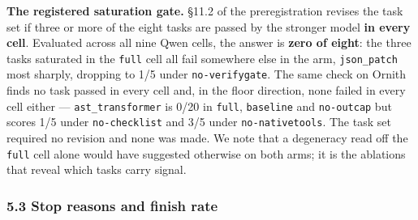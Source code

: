 \documentclass[
  10pt,
  a4paper,
]{article}
\newcounter{none} %
\let\oldtexttt\texttt
\renewcommand{\texttt}[1]{{\small\oldtexttt{#1}}}
\begin{document}
\textbf{The registered saturation gate.} §11.2 of the preregistration
revises the task set if three or more of the eight tasks are passed by
the stronger model \textbf{in every cell}. Evaluated across all nine
Qwen cells, the answer is \textbf{zero of eight}: the three tasks
saturated in the \texttt{full} cell all fail somewhere else in the arm,
\texttt{json\_patch} most sharply, dropping to 1/5 under
\texttt{no-verifygate}. The same check on Ornith finds no task passed in
every cell and, in the floor direction, none failed in every cell either
--- \texttt{ast\_transformer} is 0/20 in \texttt{full},
\texttt{baseline} and \texttt{no-outcap} but scores 1/5 under
\texttt{no-checklist} and 3/5 under \texttt{no-nativetools}. The task
set required no revision and none was made. We note that a degeneracy
read off the \texttt{full} cell alone would have suggested otherwise on
both arms; it is the ablations that reveal which tasks carry signal.

\subsubsection{5.3 Stop reasons and finish
rate}\label{stop-reasons-and-finish-rate}
\end{document}
